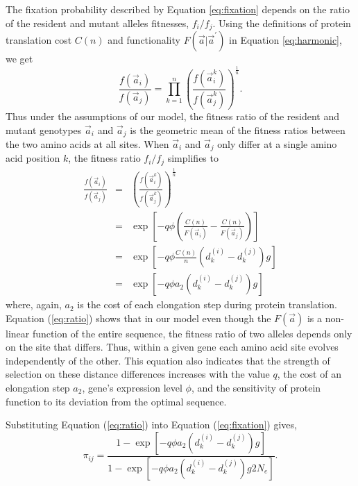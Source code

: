 \documentclass[13pt]{article}
\newcommand{\avec}{\ensuremath{\vec{a}}\xspace}
\newcommand{\avecopt}{\ensuremath{\vec{a}^\prime}\xspace}
\begin{document}
The fixation probability described by Equation \ref{eq:fixation} depends on the ratio of the resident and mutant alleles fitnesses,  $f_i/f_j$.
Using the definitions of protein translation cost $C(n)$ and functionality $F\left(\avec|\avecopt\right)$ in Equation \ref{eq:harmonic}, we get
\begin{equation}
\frac{f\left(\avec_i\right)}{f\left(\avec_j\right)} = \prod_{k=1}^n\left( \frac{f\left(\avec_i^k\right)}{f\left(\avec_j^k\right)}\right)^{\frac{1}{n}}.
\end{equation}
Thus under the assumptions of our model, the fitness ratio of the resident and mutant genotypes $\avec_i$ and $\avec_j$ is the geometric mean of the fitness ratios between the two amino acids at all sites.
When $\avec_i$ and $\avec_j$ only differ at a single amino acid position $k$, the fitness ratio $f_i/f_j$ simplifies to  
\begin{eqnarray}
\frac{f\left(\avec_i\right)}{f\left(\avec_j\right)} & = & \left( \frac{f\left(\avec_i^k\right)}{f\left(\avec_j^k\right)}\right)^{\frac{1}{n}}\\
 & = &\exp \left[-q \phi \left( \frac{ C(n) }{F\left(\avec_i \right)} - \frac{ C(n)}{F\left(\avec_j \right)}\right)\right] \nonumber\\
& = & \exp\left[ - q \phi \frac{C(n)}{n}\left(d_k^{(i)} - d_k^{(j)}\right) g\right]\\
& = & \exp\left[ - q \phi a_2 \left(d_k^{(i)} - d_k^{(j)}\right) g\right] \label{eq:ratio}
\end{eqnarray}
where, again, $a_2$ is the cost of each elongation step during protein translation. 
Equation (\ref{eq:ratio}) shows that in our model even though the $F(\avec)$ is a non-linear function of the entire sequence,  the fitness ratio of two alleles depends only on the site that differs.
Thus,  within a given gene each amino acid site  evolves independently of the other.
This equation also indicates that the strength of selection on these distance differences increases with the value $q$, the cost of an elongation step $a_2$, gene's expression level $\phi$, and the sensitivity of protein function to its deviation from the optimal sequence.


Substituting Equation (\ref{eq:ratio}) into Equation (\ref{eq:fixation}) gives,
\begin{equation}
\pi_{ij} = \frac{1-\exp\left[ - q \phi a_2 \left(d_k^{(i)} - d_k^{(j)}\right) g\right]}{1-\exp\left[ - q \phi a_2 \left(d_k^{(i)} - d_k^{(j)}\right) g 2N_e\right]}.
\label{eq:fixationII}
\end{equation}
\end{document}

